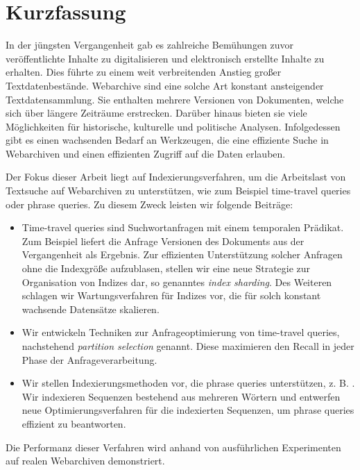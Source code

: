 \chapter{Kurzfassung}


In der j\"ungsten Vergangenheit gab es zahlreiche Bem\"uhungen zuvor veröffentlichte Inhalte zu digitalisieren und elektronisch erstellte Inhalte zu erhalten. Dies f\"uhrte zu einem weit verbreitenden Anstieg großer Textdatenbest\"ande. Webarchive sind eine solche Art konstant ansteigender Textdatensammlung. Sie enthalten mehrere Versionen von Dokumenten, welche sich \"uber l\"angere Zeitr\"aume erstrecken. Dar\"uber hinaus bieten sie viele M\"oglichkeiten f\"ur historische, kulturelle und politische Analysen. Infolgedessen gibt es einen wachsenden Bedarf an Werkzeugen, die eine effiziente Suche in Webarchi\-ven und einen effizienten Zugriff auf die Daten erlauben.

Der Fokus dieser Arbeit liegt auf Indexierungsverfahren, um die Arbeitslast von Text\-suche auf Webarchiven zu unterst\"utzen, wie zum Beispiel time-travel queries oder phrase queries. Zu diesem Zweck leisten wir folgende Beitr\"age:

\begin{itemize}
\item Time-travel queries sind Suchwortanfragen mit einem temporalen Pr\"adikat. Zum Beispiel liefert die Anfrage  Versionen des Dokuments aus der Vergangenheit als Ergebnis. Zur effizienten Unterst\"utzung solcher Anfragen ohne die Indexgr\"oße aufzublasen, stellen wir eine neue Strategie zur Organisation von Indizes dar, so genanntes \emph{index sharding}. Des Weiteren schlagen wir Wartungsverfahren f\"ur Indizes vor, die f\"ur solch konstant wachsende Datens\"atze skalieren.

\item Wir entwickeln Techniken zur Anfrageoptimierung von time-travel queries, nachstehend \emph{partition selection} genannt. Diese maximieren den Recall in jeder Phase der Anfrageverarbeitung.

\item Wir stellen Indexierungsmethoden vor, die phrase queries unterst\"utzen, z. B. . Wir indexieren Sequenzen bestehend aus mehreren W\"ortern und entwerfen neue Optimierungsverfahren f\"ur die indexierten Sequenzen, um phrase queries effizient zu beantworten.

\end{itemize}
Die Performanz dieser Verfahren wird anhand von ausf\"uhrlichen Experimenten auf realen Webarchiven demonstriert.